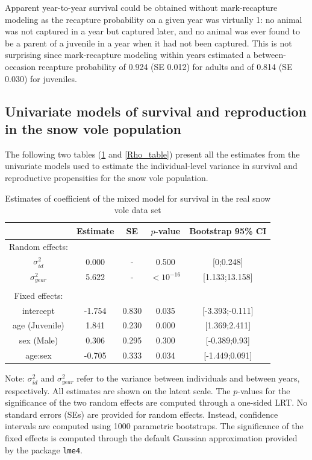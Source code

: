 Apparent year-to-year survival could be obtained without mark-recapture modeling as the recapture probability on a given year was virtually 1: no animal was not captured in a year but captured later, and no animal was ever found to be a parent of a juvenile in a year when it had not been captured. This is not surprising since mark-recapture modeling within years estimated a between-occasion recapture probability of 0.924 (SE 0.012) for adults and of 0.814 (SE 0.030) for juveniles.


\subsection{Univariate models of survival and reproduction in the snow vole population}\label{ap:Uni}

The following two tables (\ref{Phi_table} and \ref{Rho_table}) present all the estimates from the univariate models used to estimate the individual-level variance in survival and reproductive propensities for the snow vole population.
\begin{table}[ht]
\begin{center}
\caption{Estimates of coefficient of the mixed model for survival in the real snow vole data set}\label{Phi_table}
\footnotesize
\begin{tabular}{ccccc}
  \toprule
 & Estimate & SE & $p$-value & Bootstrap 95\% CI  \\ 
  \midrule
	Random effects:\\
$\sigma_{id}^2$ & 0.000 & - & 0.500 & [0;0.248] \\ 
  $\sigma_{year}^2$ & 5.622 & - & $<10^{-16}$ & [1.133;13.158] \\ 
	\\
   Fixed effects:\\
intercept & -1.754 & 0.830 & 0.035 & [-3.393;-0.111] \\ 
  age (Juvenile) & 1.841 & 0.230 & 0.000 & [1.369;2.411] \\ 
  sex (Male) & 0.306 & 0.295 & 0.300 & [-0.389;0.93] \\ 
  age:sex & -0.705 & 0.333 & 0.034 & [-1.449;0.091] \\ 
   \bottomrule
\end{tabular}
\end{center}
{\scriptsize Note: $\sigma_{id}^2$ and $\sigma_{year}^2$ refer to the variance between individuals and between years, respectively. All estimates are shown on the latent scale. The $p$-values for the significance of the two random effects are computed through a one-sided LRT. No standard errors (SEs) are provided for random effects. Instead, confidence intervals are computed using 1000 parametric bootstraps. The significance of the fixed effects is computed through the default Gaussian approximation provided by the package \texttt{lme4}.}
\end{table}


